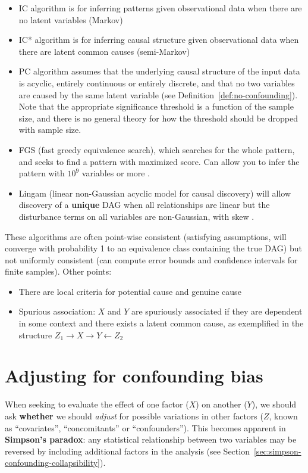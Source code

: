 \documentclass[11pt]{article}
\numberwithin{equation}{section}
\begin{document}
\begin{itemize}
\item IC algorithm is for inferring patterns given observational data when there are no latent variables (Markov)
\item IC* algorithm is for inferring causal structure given observational data when there are latent common causes (semi-Markov) 
\item PC algorithm \citep{spirtes10} assumes that the underlying causal structure of the input data is acyclic, entirely continuous or entirely discrete, and that no two variables are caused by the same latent variable (see Definition~\ref{def:no-confounding}). Note that the appropriate significance threshold is a function of the sample size, and there is no general theory for how the threshold should be dropped with sample size.
\item FGS (fast greedy equivalence search), which searches for the whole pattern, and seeks to find a pattern with maximized score. Can allow you to infer the pattern with $10^9$ variables or more \citep{Ramsey17}.
\item Lingam (linear non-Gaussian acyclic model for causal discovery) will allow discovery of a \textbf{unique} DAG when all relationships are linear but the disturbance terms on all variables are non-Gaussian, with skew \citep{Shimizu06}.
\end{itemize}

These algorithms are often point-wise consistent (satisfying assumptions, will converge with probability 1 to an equivalence class containing the true DAG) but not uniformly consistent (can compute error bounds and confidence intervals for finite samples). Other points:
\begin{itemize}
\item There are local criteria for potential cause and genuine cause
\item Spurious association: $X$ and $Y$ are spuriously associated if they are dependent in some context and there exists a latent common cause, as exemplified in the structure $Z_1 \rightarrow X \rightarrow Y \leftarrow Z_2$
\end{itemize}

\section{Adjusting for confounding bias}

When seeking to evaluate the effect of one factor ($X$) on another ($Y$), we should ask \textbf{whether} we should \textit{adjust} for possible variations in other factors ($Z$, known as ``covariates'', ``concomitants'' or ``confounders''). This becomes apparent in \textbf{Simpson's paradox}: any statistical relationship between two variables may be reversed by including additional factors in the analysis (see Section~\ref{sec:simpson-confounding-collapsibility}).
\end{document}
